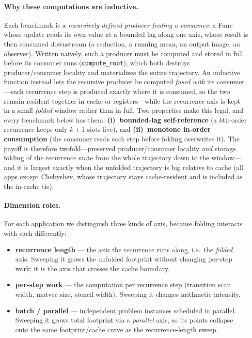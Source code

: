 \paragraph{Why these computations are inductive.}
Each benchmark is a \emph{recursively-defined producer feeding a consumer}: a Func
whose update reads its own value at a bounded lag along one axis, whose result is
then consumed downstream (a reduction, a running mean, an output image, an
observer). Written naively, such a producer must be computed and stored in full
before its consumer runs (\texttt{compute\_root}), which both destroys
producer/consumer locality and materializes the entire trajectory. An inductive
function instead lets the recursive producer be computed \emph{fused with} its
consumer---each recurrence step is produced exactly where it is consumed, so the
two remain resident together in cache or registers---while the recurrence axis is
kept in a small \emph{folded} window rather than in full. Two properties make this
legal, and every benchmark below has them: \textbf{(i)~bounded-lag self-reference}
(a $k$th-order recurrence keeps only $k{+}1$ slots live), and
\textbf{(ii)~monotone in-order consumption} (the consumer reads each step before
folding overwrites it). The payoff is therefore twofold---preserved
producer/consumer locality \emph{and} storage folding of the recurrence state from
the whole trajectory down to the window---and it is largest exactly when the
unfolded trajectory is big relative to cache (all apps except Chebyshev, whose
trajectory stays cache-resident and is included as the in-cache tie).

\paragraph{Dimension roles.}
For each application we distinguish three kinds of axis, because folding interacts
with each differently:
\begin{itemize}
  \item \textbf{recurrence length} --- the axis the recurrence runs along, i.e.\ the
    \emph{folded} axis. Sweeping it grows the unfolded footprint without changing
    per-step work; it is the axis that crosses the cache boundary.
  \item \textbf{per-step work} --- the computation per recurrence step (transition
    scan width, matvec size, stencil width). Sweeping it changes arithmetic
    intensity.
  \item \textbf{batch / parallel} --- independent problem instances scheduled in
    parallel. Sweeping it grows total footprint via a \emph{parallel} axis, so its
    points collapse onto the same footprint/cache curve as the recurrence-length
    sweep.
\end{itemize}


